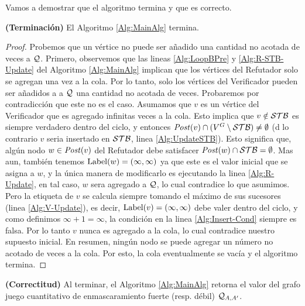 	 Vamos a demostrar que el algoritmo termina y que es correcto.

\sloppy \begin{theorem}\label{thm:alg-termination}  \textbf{(Terminación)} El Algoritmo \ref{Alg:MainAlg} termina.
\end{theorem}
\begin{proof}
Probemos que un vértice no puede ser añadido una cantidad no acotada de veces a $\mathcal{Q}$. 
Primero, observemos que las lineas \ref{Alg:LoopBPre} y \ref{Alg:R-STB-Update} del Algoritmo  \ref{Alg:MainAlg} implican que los vértices del Refutador solo se agregan una vez a la cola. 
Por lo tanto, solo los vértices del Verificador pueden ser añadidos a a $\mathcal{Q}$ una cantidad no acotada de veces.
Probaremos por contradicción que este no es el caso. 
Asumamos que $v$ es un vértice del Verificador que es agregado infinitas veces a la cola. 
Esto implica que $v \notin \mathcal{STB}$ es siempre verdadero dentro del ciclo, y entonces 
$\mathit{Post}(v) \cap (V^G \setminus \mathcal{STB}) \neq \emptyset$ (d lo contrario $v$ seria insertado en $\mathcal{STB}$, linea \ref{Alg:UpdateSTB}). 
Esto significa que,  algún nodo $w \in \mathit{Post}(v)$ del Refutador debe satisfacer $\mathit{Post}(w) \cap \mathcal{STB} = \emptyset$. 
Mas aun, también tenemos $\operatorname{Label}(w) = (\infty, \infty)$ ya que este es el valor inicial que se asigna a $w$, 
y la única manera de modificarlo es ejecutando la linea \ref{Alg:R-Update}, 
en tal caso, $w$ sera agregado a $\mathcal{Q}$, lo cual contradice lo que asumimos. 
Pero la etiqueta de $v$ se calcula siempre tomando el máximo de sus sucesores (linea \ref{Alg:V-Update}), es decir, 
$\operatorname{Label}(v) = (\infty, \infty)$ debe valer dentro del ciclo, y como definimos $\infty + 1 = \infty$, la condición en la linea \ref{Alg:Insert-Cond} siempre es falsa.
Por lo tanto $v$ nunca es agregado a la cola, lo cual contradice nuestro supuesto inicial. 
En resumen, ningún nodo se puede agregar un número no acotado de veces a la cola. Por esto, 
la cola eventualmente se vacía y el algoritmo termina.
\qedhere
\end{proof} 
\sloppy \begin{theorem}\label{thm:alg-correctness} \textbf{(Correctitud)} Al terminar, el Algoritmo \ref{Alg:MainAlg} 
retorna el valor del grafo juego cuantitativo de enmascaramiento fuerte (resp. débil) $\mathcal{Q}_{A, A'}$.
\end{theorem}
\iffalse
